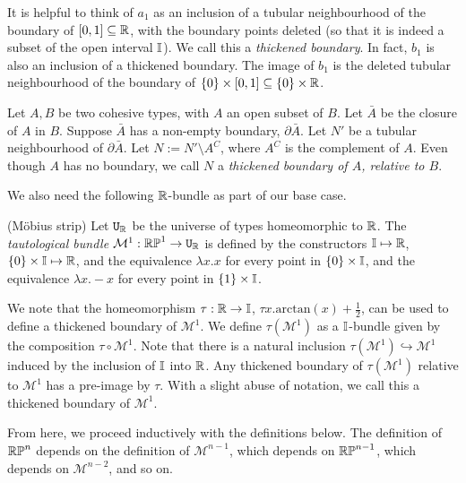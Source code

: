 \documentclass{amsart}
\begin{document}
It is helpful to think of $a_1$ as an inclusion of a tubular neighbourhood of the boundary of $[0,1] \subseteq \mathbb{R}$, with the boundary points deleted (so that it is indeed a subset of the open interval $\mathbb{I}$). We call this a \emph{thickened boundary}. In fact, $b_1$ is also an inclusion of a thickened boundary. The image of $b_1$ is the deleted tubular neighbourhood of the boundary of $\{0\} \times [0,1] \subseteq \{0\} \times \mathbb{R}$.

\begin{definition}
Let $A, B$ be two cohesive types, with $A$ an open subset of $B$. Let $\bar{A}$ be the closure of $A$ in $B$. Suppose $\bar{A}$ has a non-empty boundary, $\partial \bar{A}$. Let $N'$ be a tubular neighbourhood of $\partial\bar{A}$. Let $N := N' \setminus A^C$, where $A^C$ is the complement of $A$. Even though $A$ has no boundary, we call $N$ a \emph{thickened boundary of $A$, relative to $B$}.
\end{definition}

We also need the following $\mathbb{R}$-bundle as part of our base case. 
\begin{definition}(M\"{o}bius strip)
Let $\mathtt{U}_{\mathbb{R}}$ be the universe of types homeomorphic to $\mathbb{R}$. The \emph{tautological bundle} $\mathcal{M}^1: \mathbb{RP}^1 \rightarrow \mathtt{U}_{\mathbb{R}}$ is defined by the constructors $\mathbb{I} \mapsto \mathbb{R}$, $\{0 \} \times \mathbb{I} \mapsto \mathbb{R}$, and the equivalence $\lambda x. x$ for every point in $\{0\} \times \mathbb{I}$, and the equivalence $\lambda x. -x$ for every point in $\{1\} \times \mathbb{I}$.
\end{definition}

We note that the homeomorphism $\tau: \mathbb{R} \rightarrow \mathbb{I}$, $\tau x. \text{arctan}(x)+ \frac{1}{2}$, can be used to define a thickened boundary of $\mathcal{M}^1$. We define $\tau(\mathcal{M}^1)$ as a $\mathbb{I}$-bundle given by the composition $\tau \circ \mathcal{M}^1$.  Note that there is a natural inclusion $\tau(\mathcal{M}^1) \hookrightarrow \mathcal{M}^1$ induced by the inclusion of $\mathbb{I}$ into $\mathbb{R}$. Any thickened boundary of $\tau(\mathcal{M}^1)$ relative to $\mathcal{M}^1$ has a pre-image by $\tau$. With a slight abuse of notation, we call this a thickened boundary of $\mathcal{M}^1$. 

From here, we proceed inductively with the definitions below. The definition of $\mathbb{RP}^n$ depends on the definition of $\mathcal{M}^{n-1}$, which depends on $\mathbb{RP}^{n-1}$, which depends on $\mathcal{M}^{n-2}$, and so on.
\end{document}
